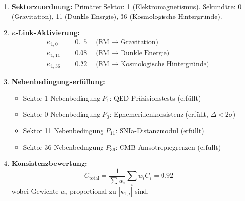 \documentclass[13pt,a4paper]{article}
\begin{document}
	\begin{enumerate}[leftmargin=*]
		\item \textbf{Sektorzuordnung:} Primärer Sektor: 1 (Elektromagnetismus). Sekundäre: 0 (Gravitation), 11 (Dunkle Energie), 36 (Kosmologische Hintergründe).
		
		\item \textbf{$\kappa$-Link-Aktivierung:}
		\begin{align*}
			\kappa_{1,0} &= 0.15 \quad \text{(EM $\to$ Gravitation)} \\
			\kappa_{1,11} &= 0.08 \quad \text{(EM $\to$ Dunkle Energie)} \\
			\kappa_{1,36} &= 0.22 \quad \text{(EM $\to$ Kosmologische Hintergründe)}
		\end{align*}
		
		\item \textbf{Nebenbedingungserfüllung:}
		\begin{itemize}
			\item Sektor 1 Nebenbedingung $P_1$: QED-Präzisionstests (erfüllt)
			\item Sektor 0 Nebenbedingung $P_0$: Ephemeridenkonsistenz (erfüllt, $\Delta < 2\sigma$)
			\item Sektor 11 Nebenbedingung $P_{11}$: SNIa-Distanzmodul (erfüllt)
			\item Sektor 36 Nebenbedingung $P_{36}$: CMB-Anisotropiegrenzen (erfüllt)
		\end{itemize}
		
		\item \textbf{Konsistenzbewertung:}
		\[ C_{\text{total}} = \frac{1}{\sum w_i}\sum_i w_i C_i = 0.92 \]
		wobei Gewichte $w_i$ proportional zu $|\kappa_{1,i}|$ sind.
	\end{enumerate}
	
\end{document}
